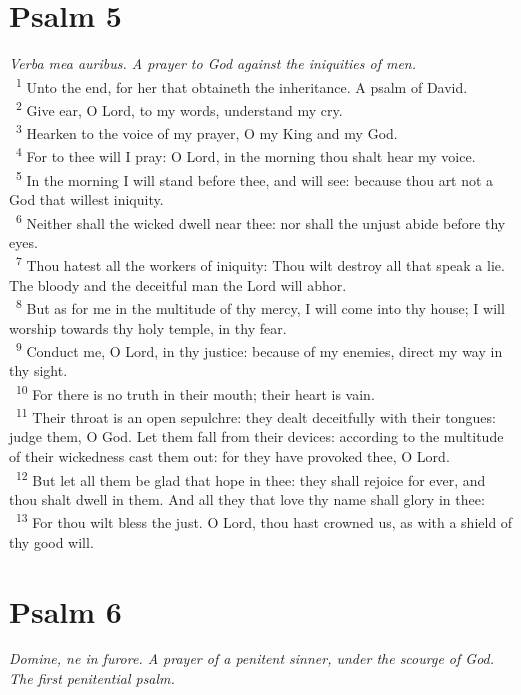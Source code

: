 \documentclass[a5paper,12pt]{article}
\begin{document}
\begin{multicols*}{2}
\section{Psalm 5}
\label{sec:orgbbc86de}
\emph{Verba mea auribus. A prayer to God against the iniquities of men.}\\

~\textsuperscript{1} Unto the end, for her that obtaineth the inheritance. A psalm of David.\\
~\textsuperscript{2} Give ear, O Lord, to my words, understand my cry.\\
~\textsuperscript{3} Hearken to the voice of my prayer, O my King and my God.\\
~\textsuperscript{4} For to thee will I pray: O Lord, in the morning thou shalt hear my voice.\\
~\textsuperscript{5} In the morning I will stand before thee, and will see: because thou art not a God that willest iniquity.\\
~\textsuperscript{6} Neither shall the wicked dwell near thee: nor shall the unjust abide before thy eyes.\\
~\textsuperscript{7} Thou hatest all the workers of iniquity: Thou wilt destroy all that speak a lie. The bloody and the deceitful man the Lord will abhor.\\
~\textsuperscript{8} But as for me in the multitude of thy mercy, I will come into thy house; I will worship towards thy holy temple, in thy fear.\\
~\textsuperscript{9} Conduct me, O Lord, in thy justice: because of my enemies, direct my way in thy sight.\\
~\textsuperscript{10} For there is no truth in their mouth; their heart is vain.\\
~\textsuperscript{11} Their throat is an open sepulchre: they dealt deceitfully with their tongues: judge them, O God. Let them fall from their devices: according to the multitude of their wickedness cast them out: for they have provoked thee, O Lord.\\
~\textsuperscript{12} But let all them be glad that hope in thee: they shall rejoice for ever, and thou shalt dwell in them. And all they that love thy name shall glory in thee:\\
~\textsuperscript{13} For thou wilt bless the just. O Lord, thou hast crowned us, as with a shield of thy good will.\\

\section{Psalm 6}
\label{sec:orgae10171}
\emph{Domine, ne in furore. A prayer of a penitent sinner, under the scourge of God. The first penitential psalm.}\\


\end{multicols*}
\end{document}
